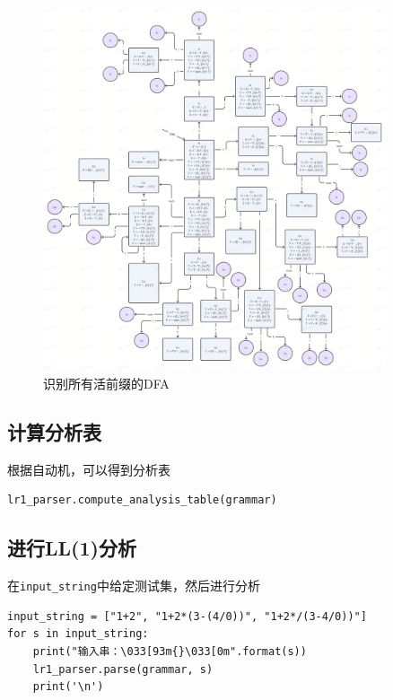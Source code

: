 \documentclass[lang=cn,11pt,a4paper]{elegantpaper}
\begin{document}
\begin{figure}[!htb]
\centering
\includegraphics[width=0.9\textwidth]{image/DFA.png}
\caption{识别所有活前缀的DFA}
\end{figure}

\subsection{计算分析表}

根据自动机，可以得到分析表

\begin{lstlisting}
lr1_parser.compute_analysis_table(grammar)
\end{lstlisting}

\subsection{进行LL(1)分析}

在\lstinline{input_string}中给定测试集，然后进行分析

\begin{lstlisting}
input_string = ["1+2", "1+2*(3-(4/0))", "1+2*/(3-4/0))"]
for s in input_string:
    print("输入串：\033[93m{}\033[0m".format(s))
    lr1_parser.parse(grammar, s)
    print('\n')
\end{lstlisting}
\end{document}
